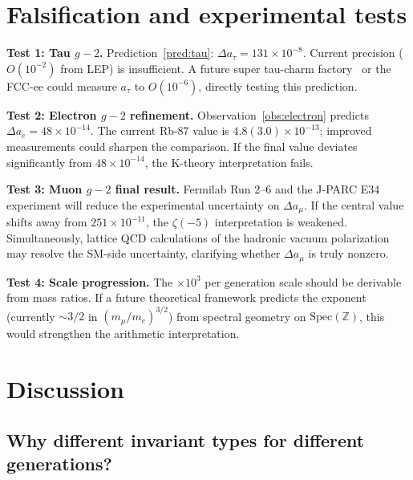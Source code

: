 \documentclass[11pt,a4paper]{article}
\newcommand{\Spec}{\mathrm{Spec}}
\begin{document}
\section{Falsification and experimental tests}
\label{sec:tests}

\textbf{Test 1: Tau $g-2$.}
Prediction~\ref{pred:tau}: $\Delta a_\tau = 131 \times 10^{-8}$.
Current precision ($O(10^{-2})$ from LEP) is insufficient.
A future super tau-charm factory~\cite{Pich2014} or the FCC-ee
could measure $a_\tau$ to $O(10^{-6})$, directly testing
this prediction.

\textbf{Test 2: Electron $g-2$ refinement.}
Observation~\ref{obs:electron} predicts
$\Delta a_e = 48 \times 10^{-14}$.
The current Rb-87 value is $4.8(3.0) \times 10^{-13}$;
improved measurements could sharpen the comparison.
If the final value deviates significantly from
$48 \times 10^{-14}$, the K-theory interpretation fails.

\textbf{Test 3: Muon $g-2$ final result.}
Fermilab Run 2--6 and the J-PARC E34 experiment will
reduce the experimental uncertainty on $\Delta a_\mu$.
If the central value shifts away from $251 \times 10^{-11}$,
the $\zeta(-5)$ interpretation is weakened.
Simultaneously, lattice QCD calculations of the hadronic
vacuum polarization~\cite{BMW2021} may resolve the SM-side
uncertainty, clarifying whether $\Delta a_\mu$ is truly nonzero.

\textbf{Test 4: Scale progression.}
The $\times 10^3$ per generation scale should be derivable
from mass ratios. If a future theoretical framework predicts
the exponent (currently $\sim 3/2$ in $(m_{\mu}/m_e)^{3/2}$)
from spectral geometry on $\Spec(\mathbb{Z})$, this would
strengthen the arithmetic interpretation.

\section{Discussion}
\label{sec:discussion}

\subsection{Why different invariant types for different generations?}
\end{document}
